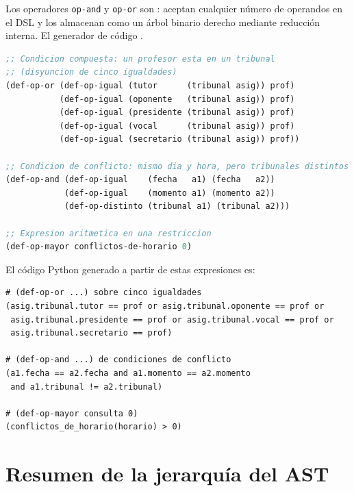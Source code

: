 \documentclass[12pt,a4paper]{report}
\begin{document}
\medskip
Los operadores \texttt{op-and} y \texttt{op-or} son : aceptan
cualquier número de operandos en el DSL y los almacenan como un árbol binario
derecho mediante reducción interna.  El generador de código  .


\begin{lstlisting}[language=CommonLisp,
  caption={Uso combinado de operaciones logicas, relacionales y aritmeticas.}]
;; Condicion compuesta: un profesor esta en un tribunal
;; (disyuncion de cinco igualdades)
(def-op-or (def-op-igual (tutor      (tribunal asig)) prof)
           (def-op-igual (oponente   (tribunal asig)) prof)
           (def-op-igual (presidente (tribunal asig)) prof)
           (def-op-igual (vocal      (tribunal asig)) prof)
           (def-op-igual (secretario (tribunal asig)) prof))

;; Condicion de conflicto: mismo dia y hora, pero tribunales distintos
(def-op-and (def-op-igual    (fecha   a1) (fecha   a2))
            (def-op-igual    (momento a1) (momento a2))
            (def-op-distinto (tribunal a1) (tribunal a2)))

;; Expresion aritmetica en una restriccion
(def-op-mayor conflictos-de-horario 0)
\end{lstlisting}

El código Python generado a partir de estas expresiones es:

\begin{lstlisting}[style=pythonstyle, caption={Expresiones Python generadas por el compilador del DST.}]
# (def-op-or ...) sobre cinco igualdades
(asig.tribunal.tutor == prof or asig.tribunal.oponente == prof or
 asig.tribunal.presidente == prof or asig.tribunal.vocal == prof or
 asig.tribunal.secretario == prof)

# (def-op-and ...) de condiciones de conflicto
(a1.fecha == a2.fecha and a1.momento == a2.momento
 and a1.tribunal != a2.tribunal)

# (def-op-mayor consulta 0)
(conflictos_de_horario(horario) > 0)
\end{lstlisting}

\section{Resumen de la jerarquía del AST}
\label{sec:resumen-jerarquia}
\end{document}
